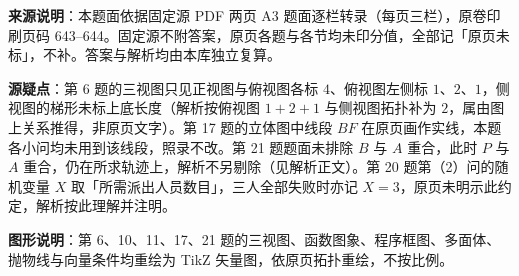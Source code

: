 


\begin{gktip}
\textbf{来源说明}：本题面依据固定源 PDF 两页 A3 题面逐栏转录（每页三栏），原卷印刷页码 643–644。固定源不附答案，原页各题与各节均未印分值，全部记「原页未标」，不补。答案与解析均由本库独立复算。

\textbf{源疑点}：第 6 题的三视图只见正视图与俯视图各标 $4$、俯视图左侧标 $1$、$2$、$1$，侧视图的梯形未标上底长度（解析按俯视图 $1+2+1$ 与侧视图拓扑补为 $2$，属由图上关系推得，非原页文字）。第 17 题的立体图中线段 $BF$ 在原页画作实线，本题各小问均未用到该线段，照录不改。第 21 题题面未排除 $B$ 与 $A$ 重合，此时 $P$ 与 $A$ 重合，仍在所求轨迹上，解析不另剔除（见解析正文）。第 20 题第（2）问的随机变量 $X$ 取「所需派出人员数目」，三人全部失败时亦记 $X=3$，原页未明示此约定，解析按此理解并注明。

\textbf{图形说明}：第 6、10、11、17、21 题的三视图、函数图象、程序框图、多面体、抛物线与向量条件均重绘为 TikZ 矢量图，依原页拓扑重绘，不按比例。
\end{gktip}



